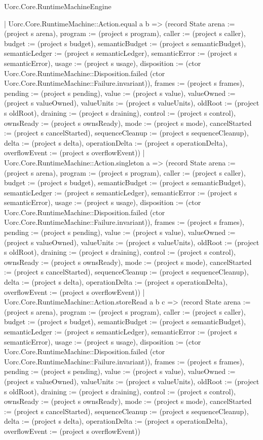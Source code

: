\begin{lexlean}{Uorc.Core.RuntimeMachineEngine}
\begin{semanticmodule}
{      | Uorc.Core.RuntimeMachine::Action.equal a b => (record State {arena := (project s arena), program := (project s program), caller := (project s caller), budget := (project s budget), semanticBudget := (project s semanticBudget), semanticLedger := (project s semanticLedger), semanticError := (project s semanticError), usage := (project s usage), disposition := (ctor Uorc.Core.RuntimeMachine::Disposition.failed (ctor Uorc.Core.RuntimeMachine::Failure.invariant)), frames := (project s frames), pending := (project s pending), value := (project s value), valueOwned := (project s valueOwned), valueUnits := (project s valueUnits), oldRoot := (project s oldRoot), draining := (project s draining), control := (project s control), ownsReady := (project s ownsReady), mode := (project s mode), cancelStarted := (project s cancelStarted), sequenceCleanup := (project s sequenceCleanup), delta := (project s delta), operationDelta := (project s operationDelta), overflowEvent := (project s overflowEvent)})
      | Uorc.Core.RuntimeMachine::Action.singleton a => (record State {arena := (project s arena), program := (project s program), caller := (project s caller), budget := (project s budget), semanticBudget := (project s semanticBudget), semanticLedger := (project s semanticLedger), semanticError := (project s semanticError), usage := (project s usage), disposition := (ctor Uorc.Core.RuntimeMachine::Disposition.failed (ctor Uorc.Core.RuntimeMachine::Failure.invariant)), frames := (project s frames), pending := (project s pending), value := (project s value), valueOwned := (project s valueOwned), valueUnits := (project s valueUnits), oldRoot := (project s oldRoot), draining := (project s draining), control := (project s control), ownsReady := (project s ownsReady), mode := (project s mode), cancelStarted := (project s cancelStarted), sequenceCleanup := (project s sequenceCleanup), delta := (project s delta), operationDelta := (project s operationDelta), overflowEvent := (project s overflowEvent)})
      | Uorc.Core.RuntimeMachine::Action.storeRead a b c => (record State {arena := (project s arena), program := (project s program), caller := (project s caller), budget := (project s budget), semanticBudget := (project s semanticBudget), semanticLedger := (project s semanticLedger), semanticError := (project s semanticError), usage := (project s usage), disposition := (ctor Uorc.Core.RuntimeMachine::Disposition.failed (ctor Uorc.Core.RuntimeMachine::Failure.invariant)), frames := (project s frames), pending := (project s pending), value := (project s value), valueOwned := (project s valueOwned), valueUnits := (project s valueUnits), oldRoot := (project s oldRoot), draining := (project s draining), control := (project s control), ownsReady := (project s ownsReady), mode := (project s mode), cancelStarted := (project s cancelStarted), sequenceCleanup := (project s sequenceCleanup), delta := (project s delta), operationDelta := (project s operationDelta), overflowEvent := (project s overflowEvent)})
}
\end{semanticmodule}
\end{lexlean}
